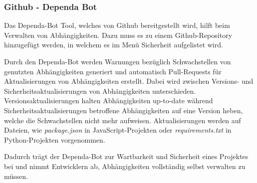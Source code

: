 \subsubsection{Github - Dependa Bot} \label{sec:Dependa}
    Das Dependa-Bot Tool, welches von Github bereitgestellt wird, hilft beim Verwalten von Abhängig\-keiten.
    Dazu muss es zu einem Github-Repository hinzugefügt werden, in welchem es im Menü Sicherheit aufgelistet wird. %

    Durch den Dependa-Bot werden Warnungen bezüglich Schwachstellen von genutzten Abhängigkeiten generiert und automatisch Pull-Requests für Aktualisierungen von Abhängigkeiten erstellt.
    Dabei wird zwischen Versions- und Sicherheitsaktualisierungen von Abhängigkeiten unterschieden.
    Versionsaktualisierungen halten Abhängigkeiten up-to-date während Sicherheitsaktualisierungen betroffene Abhängigkeiten auf eine Version heben, welche die Schwachstellen nicht mehr aufweisen.
    Aktualisierungen werden auf Dateien, wie \textit{package.json} in JavaScript-Projekten oder \textit{requirements.txt} in Python-Projekten vorgenommen.

    Dadurch trägt der Dependa-Bot zur Wartbarkeit und Sicherheit eines Projektes bei und nimmt Entwicklern ab, Abhängigkeiten vollständig selbst verwalten zu müssen.